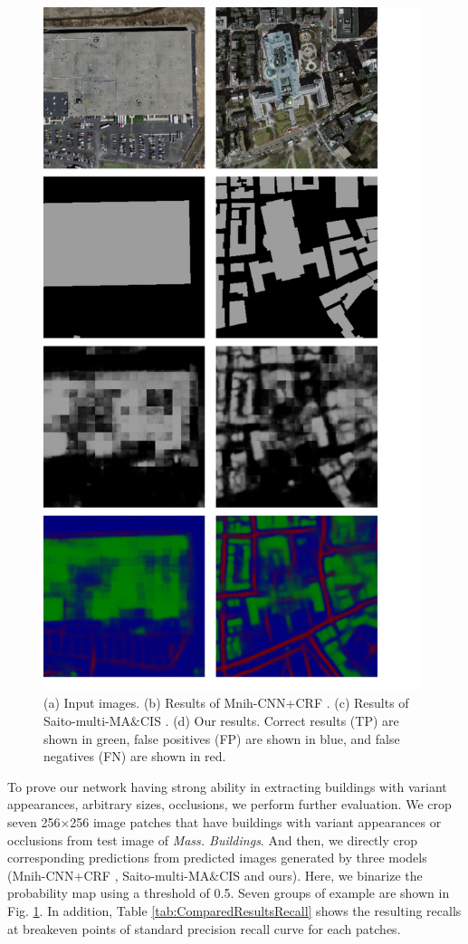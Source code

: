 \documentclass[runningheads]{llncs}
\begin{document}
 	 
\begin{figure}
\centering
\includegraphics[width=110mm]{ComparedResults}
\caption{(a) Input images. (b) Results of Mnih-CNN+CRF \cite{Mnih2013Machine}. (c) Results of Saito-multi-MA$\&$CIS \cite{Saito2016Multiple}. (d) Our results. 
Correct results (TP) are shown in green, false positives (FP) are shown in blue, and false negatives (FN) are shown in red.}
\label{fig:ComparedResults}
\end{figure} 
    
 
  To prove our network having strong ability in extracting buildings with variant appearances, arbitrary sizes, occlusions, we perform  further evaluation. We crop seven 256$\times$256 image patches that have buildings with variant appearances or occlusions from test image of \textit{Mass. Buildings}. And then, we directly crop corresponding predictions from predicted images  generated by three models (Mnih-CNN+CRF \cite{Mnih2013Machine}, Saito-multi-MA$\&$CIS \cite{Saito2016Multiple} and ours). Here, we binarize the probability map using a threshold of 0.5. Seven groups of example are shown in Fig. \ref{fig:ComparedResults}. In addition, Table \ref{tab:ComparedResultsRecall} shows the resulting recalls at breakeven points of standard precision recall curve for each patches. 
 
\end{document}
